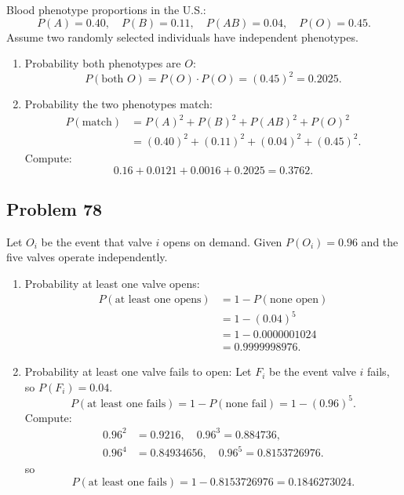 \documentclass{article}
\begin{document}
Blood phenotype proportions in the U.S.:
\[
P(A)=0.40,\quad P(B)=0.11,\quad P(AB)=0.04,\quad P(O)=0.45.
\]
Assume two randomly selected individuals have independent phenotypes.

\begin{enumerate}
\item[(a)] Probability both phenotypes are $O$:
\[
P(\text{both }O)=P(O)\cdot P(O)=(0.45)^2=0.2025.
\]

\item[(b)] Probability the two phenotypes match:
\[
\begin{aligned}
P(\text{match})
&=P(A)^2+P(B)^2+P(AB)^2+P(O)^2\\
&=(0.40)^2+(0.11)^2+(0.04)^2+(0.45)^2.
\end{aligned}
\]
Compute:
\[
0.16+0.0121+0.0016+0.2025=0.3762.
\]
\end{enumerate}

\subsection*{Problem 78}

Let $O_i$ be the event that valve $i$ opens on demand. Given $P(O_i)=0.96$ and the five valves operate
independently.

\begin{enumerate}
\item[(a)] Probability at least one valve opens:
\[
\begin{aligned}
P(\text{at least one opens})
&= 1 - P(\text{none open})\\
&= 1 - (0.04)^5\\
&= 1 - 0.0000001024\\
&= 0.9999998976.
\end{aligned}
\]

\item[(b)] Probability at least one valve fails to open:
Let $F_i$ be the event valve $i$ fails, so $P(F_i)=0.04$.
\[
P(\text{at least one fails}) = 1 - P(\text{none fail})
= 1 - (0.96)^5.
\]
Compute:
\[
\begin{aligned}
0.96^2&=0.9216,\quad 0.96^3=0.884736,\\
0.96^4&=0.84934656,\quad 0.96^5=0.8153726976.
\end{aligned}
\]
so
\[
P(\text{at least one fails}) = 1 - 0.8153726976 = 0.1846273024.
\]
\end{enumerate}
\end{document}
